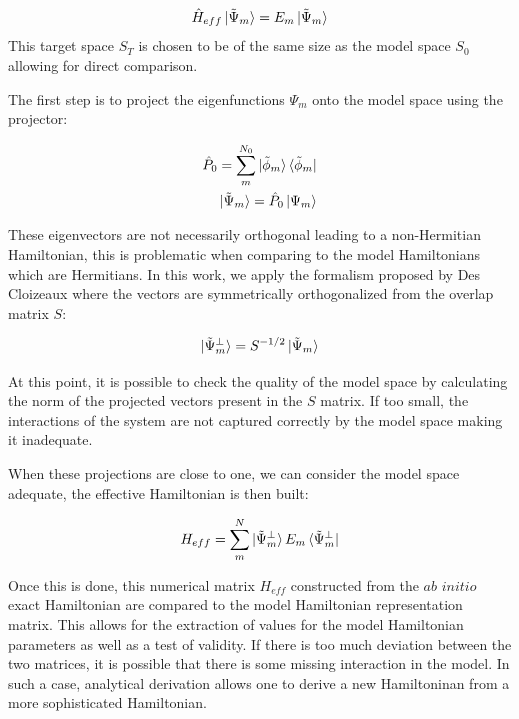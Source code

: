 \documentclass[12pt]{report}
\numberwithin{equation}{section}
\begin{document}
\begin{equation}
    \hat{H}_{eff}\ket{\tilde{\Psi}_m}=E_m \ket{\tilde{\Psi}_m}
\end{equation}
This target space $S_T$ is chosen to be of the same size as the model space $S_0$ allowing for direct comparison.

The first step is to project the eigenfunctions $\Psi_m$ onto the model space using the projector:

\begin{align}
    \hat{P}_0=\sum_{m}^{N_0} \ket{\tilde{\phi}_m} \bra{\tilde{\phi}_m}\\
    \ket{\tilde{\Psi}_m}=\hat{P}_0 \ket{\Psi_m}
\end{align}

These eigenvectors are not necessarily orthogonal leading to a non-Hermitian Hamiltonian, this is problematic when comparing to the model Hamiltonians which are Hermitians.
In this work, we apply the formalism proposed by Des Cloizeaux where the vectors are symmetrically orthogonalized\cite{des_cloizeaux_extension_1960} from the overlap matrix $S$:

\begin{equation}
    \ket{\tilde{\Psi}_m^\bot}=S^{-1/2} \ket{\tilde{\Psi}_m}
\end{equation}

At this point, it is possible to check the quality of the model space by calculating the norm of the projected vectors present in the $S$ matrix.
If too small, the interactions of the system are not captured correctly by the model space making it inadequate. 
\par When these projections are close to one, we can consider the model space adequate, the effective Hamiltonian is then built:

\begin{equation}
    H_{eff}=\sum_{m}^{N}\ket{\tilde{\Psi}_m^{\bot}}E_m \bra{\tilde{\Psi}_m^{\bot}}
\end{equation}

Once this is done, this numerical matrix $H_{eff}$ constructed from the $\textit{ab}$ $\textit{initio}$ exact Hamiltonian are compared to the model Hamiltonian representation matrix. 
This allows for the extraction of values for the model Hamiltonian parameters as well as a test of validity.
If there is too much deviation between the two matrices, it is possible that there is some missing interaction in the model.
In such a case, analytical derivation allows one to derive a new Hamiltoninan from a more sophisticated Hamiltonian.
\end{document}
